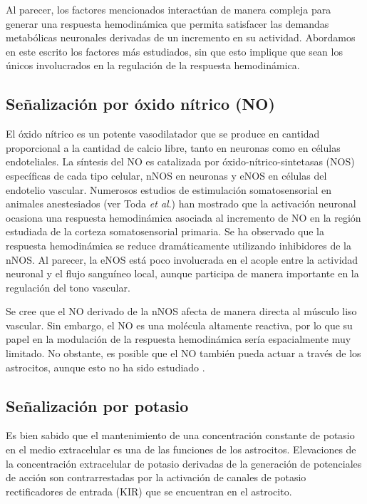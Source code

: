 Al parecer, los factores mencionados interactúan de manera compleja para generar una respuesta hemodinámica que permita satisfacer las demandas metabólicas neuronales derivadas de un incremento en su actividad. Abordamos en este escrito los factores más estudiados, sin que esto implique que sean los únicos involucrados en la regulación de la respuesta hemodinámica.

\subsection{Señalización por óxido nítrico (NO)}
El óxido nítrico es un potente vasodilatador que se produce en cantidad proporcional a la cantidad de calcio libre, tanto en neuronas como en células endoteliales. La síntesis del  NO es catalizada por  óxido-nítrico-sintetasas (NOS) específicas de cada tipo celular, nNOS en neuronas y eNOS en células del endotelio vascular.  Numerosos estudios de estimulación somatosensorial en animales anestesiados (ver Toda \emph{et al}.\cite{TodaN2009}) han mostrado que la activación neuronal ocasiona una respuesta hemodinámica asociada al incremento de NO en la región estudiada de la corteza somatosensorial primaria. Se ha observado que la respuesta hemodinámica se reduce dramáticamente utilizando inhibidores de la nNOS. Al parecer, la eNOS está poco involucrada en el acople entre la actividad neuronal y el flujo sanguíneo local, aunque participa de manera importante en la regulación del tono vascular.

Se cree que el NO derivado de la nNOS afecta de manera directa al músculo liso vascular. Sin embargo, el NO es una molécula altamente reactiva, por lo que su papel en la modulación de la respuesta hemodinámica sería espacialmente muy limitado. No obstante, es posible que el NO también pueda actuar a través de los astrocitos, aunque esto no ha sido estudiado \cite{KoehlerRC2009}.

\subsection{Señalización por potasio}
Es bien sabido que el mantenimiento de una concentración constante de potasio en el medio extracelular es una de las funciones de los astrocitos. Elevaciones de la concentración extracelular de potasio derivadas de la generación de potenciales de acción son contrarrestadas por la activación de canales de potasio rectificadores de entrada (KIR) que se encuentran en el astrocito.

